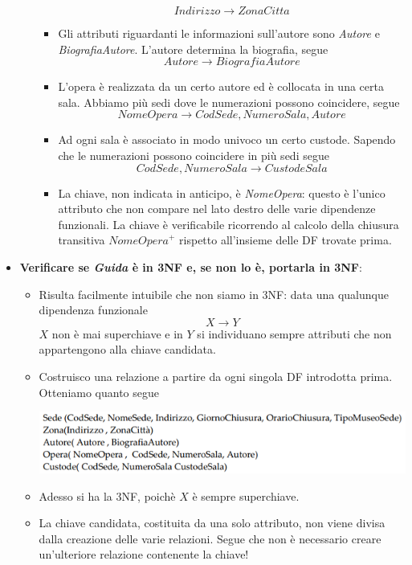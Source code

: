 \begin{itemize}
\begin{itemize}
\begin{itemize}
			\[Indirizzo \to ZonaCitta\]
			\item Gli attributi riguardanti le informazioni sull'autore sono \emph{Autore} e \emph{BiografiaAutore}. L'autore determina la biografia, segue
			\[Autore \to BiografiaAutore\]
			\item L'opera è realizzata da un certo autore ed è collocata in una certa sala. Abbiamo più sedi dove le numerazioni possono coincidere, segue
			\[NomeOpera \to CodSede, NumeroSala, Autore\]
			\item Ad ogni sala è associato in modo univoco un certo custode. Sapendo che le numerazioni possono coincidere in più sedi segue
			\[CodSede, NumeroSala \to CustodeSala\]
			\item La chiave, non indicata in anticipo, è \emph{NomeOpera}: questo è l'unico attributo che non compare nel lato destro delle varie dipendenze funzionali. La chiave è verificabile ricorrendo al calcolo della chiusura transitiva ${NomeOpera}^{+}$ rispetto all'insieme delle DF trovate prima.
		\end{itemize}
	\end{itemize}
	\item \textbf{Verificare se \emph{Guida} è in 3NF e, se non lo è, portarla in 3NF}:
	\begin{itemize}
		\item Risulta facilmente intuibile che non siamo in 3NF: data una qualunque dipendenza funzionale
		\[X \to Y\]
		$X$ non è mai superchiave e in $Y$ si individuano sempre attributi che non appartengono alla chiave candidata.
		\item Costruisco una relazione a partire da ogni singola DF introdotta prima. Otteniamo quanto segue
		\begin{center}
			\includegraphics{images/226.PNG}
		\end{center}
		\item Adesso si ha la 3NF, poichè $X$ è sempre superchiave. 
		\item La chiave candidata, costituita da una solo attributo, non viene divisa dalla creazione delle varie relazioni. Segue che non è necessario creare un'ulteriore relazione contenente la chiave!
	\end{itemize}
\end{itemize}
\pagebreak

